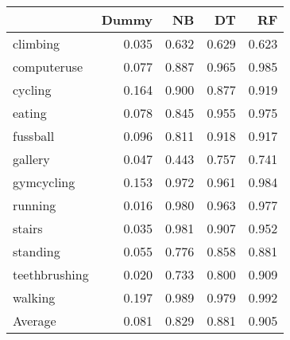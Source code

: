 \begin{tabular}{lrrrr}
\toprule
{} &  Dummy &    NB &    DT &    RF \\
\midrule
climbing      &  0.035 & 0.632 & 0.629 & 0.623 \\
computeruse   &  0.077 & 0.887 & 0.965 & 0.985 \\
cycling       &  0.164 & 0.900 & 0.877 & 0.919 \\
eating        &  0.078 & 0.845 & 0.955 & 0.975 \\
fussball      &  0.096 & 0.811 & 0.918 & 0.917 \\
gallery       &  0.047 & 0.443 & 0.757 & 0.741 \\
gymcycling    &  0.153 & 0.972 & 0.961 & 0.984 \\
running       &  0.016 & 0.980 & 0.963 & 0.977 \\
stairs        &  0.035 & 0.981 & 0.907 & 0.952 \\
standing      &  0.055 & 0.776 & 0.858 & 0.881 \\
teethbrushing &  0.020 & 0.733 & 0.800 & 0.909 \\
walking       &  0.197 & 0.989 & 0.979 & 0.992 \\
Average       &  0.081 & 0.829 & 0.881 & 0.905 \\
\bottomrule
\end{tabular}

